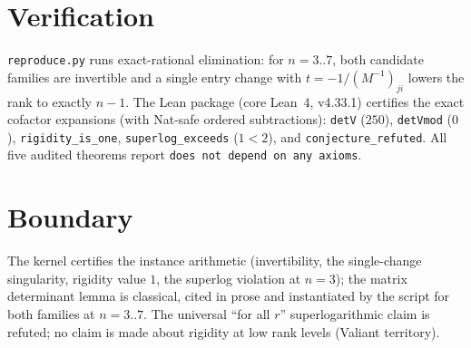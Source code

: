 \documentclass[11pt]{article}
\begin{document}
\section{Verification}

\texttt{reproduce.py} runs exact-rational elimination: for $n =
3..7$, both candidate families are invertible and a single entry
change with $t = -1/(M^{-1})_{ji}$ lowers the rank to exactly $n-1$.
The Lean package (core Lean~4, v4.33.1) certifies the exact
cofactor expansions (with Nat-safe ordered subtractions):
\texttt{detV} ($250$), \texttt{detVmod} ($0$),
\texttt{rigidity\_is\_one}, \texttt{superlog\_exceeds} ($1 < 2$),
and \texttt{conjecture\_refuted}. All five audited theorems report
\texttt{does not depend on any axioms}.

\section{Boundary}

The kernel certifies the instance arithmetic (invertibility, the
single-change singularity, rigidity value $1$, the superlog violation
at $n = 3$); the matrix determinant lemma is classical, cited in
prose and instantiated by the script for both families at $n = 3..7$.
The universal ``for all $r$'' superlogarithmic claim is refuted; no
claim is made about rigidity at low rank levels (Valiant territory).
\end{document}

